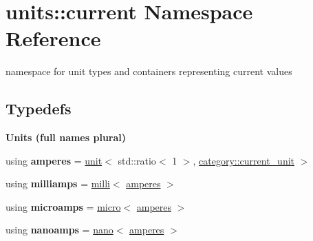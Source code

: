 \hypertarget{namespaceunits_1_1current}{}\section{units\+:\+:current Namespace Reference}
\label{namespaceunits_1_1current}


namespace for unit types and containers representing current values  


\subsection*{Typedefs}
\begin{Indent}{\bf Units (full names plural)}\par
\begin{DoxyCompactItemize}
\item 
\hypertarget{namespaceunits_1_1current_a2a2b13e4c7920eda90c4d7a34eb53ed9}{}using {\bfseries amperes} = \hyperlink{structunits_1_1unit}{unit}$<$ std\+::ratio$<$ 1 $>$, \hyperlink{namespaceunits_1_1category_af018d7d3f53e57d660b51d77c5e7a437}{category\+::current\+\_\+unit} $>$\label{namespaceunits_1_1current_a2a2b13e4c7920eda90c4d7a34eb53ed9}

\item 
\hypertarget{namespaceunits_1_1current_adfc2a455e02d07efafba9f7a0f41addc}{}using {\bfseries milliamps} = \hyperlink{group___unit_manipulators_gaec9d1c320e180eb59f3cb3094d8079dd}{milli}$<$ \hyperlink{structunits_1_1unit}{amperes} $>$\label{namespaceunits_1_1current_adfc2a455e02d07efafba9f7a0f41addc}

\item 
\hypertarget{namespaceunits_1_1current_ade35a731394579811d9684fdf8742a41}{}using {\bfseries microamps} = \hyperlink{group___unit_manipulators_gaea53c906ec805110b93f02db4a961971}{micro}$<$ \hyperlink{structunits_1_1unit}{amperes} $>$\label{namespaceunits_1_1current_ade35a731394579811d9684fdf8742a41}

\item 
\hypertarget{namespaceunits_1_1current_a61d3f0c6a23e5920de65cd6dd7a700b0}{}using {\bfseries nanoamps} = \hyperlink{group___unit_manipulators_ga1c25c3c1d6c1f3aed3fd1ecf043110d5}{nano}$<$ \hyperlink{structunits_1_1unit}{amperes} $>$\label{namespaceunits_1_1current_a61d3f0c6a23e5920de65cd6dd7a700b0}

\end{DoxyCompactItemize}
\end{Indent}
